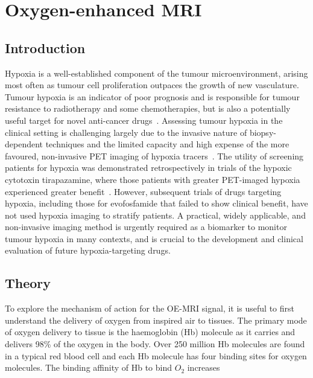 
\chapter{Oxygen-enhanced MRI}
\label{ch:oemri1}

\section{Introduction}

Hypoxia is a well-established component of the tumour microenvironment, arising most often as tumour cell proliferation outpaces the growth of new vasculature.
Tumour hypoxia is an indicator of poor prognosis and is responsible for tumour resistance to radiotherapy and some chemotherapies, but is also a potentially useful target for novel anti-cancer drugs~\cite{Wilson:2011jp}.
Assessing tumour hypoxia in the clinical setting is challenging largely due to the invasive nature of biopsy-dependent techniques and the limited capacity and high expense of the more favoured, non-invasive PET imaging of hypoxia tracers~\cite{Horsman:2012kw}.
The utility of screening patients for hypoxia was demonstrated retrospectively in trials of the hypoxic cytotoxin tirapazamine, where those patients with greater PET-imaged hypoxia experienced greater benefit~\cite{Rischin:2006fz}.
However, subsequent trials of drugs targeting hypoxia, including those for evofosfamide that failed to show clinical benefit, have not used hypoxia imaging to stratify patients.
A practical, widely applicable, and non-invasive imaging method is urgently required as a biomarker to monitor tumour hypoxia in many contexts, and is crucial to the development and clinical evaluation of future hypoxia-targeting drugs.

\section{Theory}
To explore the mechanism of action for the OE-MRI signal, it is useful to first understand the delivery of oxygen from inspired air to tissues. 
The primary mode of oxygen delivery to tissue is the haemoglobin (\acs{Hb}) molecule as it carries and delivers 98\% of the oxygen in the body. 
Over 250 million \acs{Hb} molecules are found in a typical red blood cell and each \acs{Hb} molecule has four binding sites for oxygen molecules. 
The binding affinity of \acs{Hb} to bind ${O_2}$ increases 

